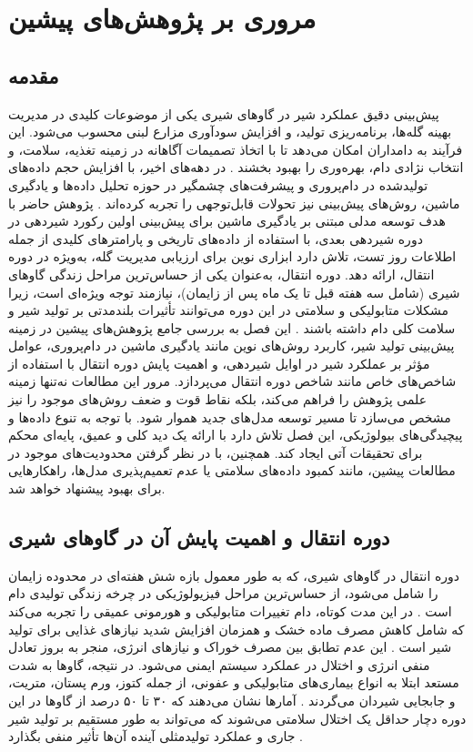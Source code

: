 \chapter{مروری بر پژوهش‌های پیشین}

\section{مقدمه}	
پیش‌بینی دقیق عملکرد شیر در گاوهای شیری یکی از موضوعات کلیدی در مدیریت بهینه گله‌ها، برنامه‌ریزی تولید، و افزایش سودآوری مزارع لبنی محسوب می‌شود. این فرآیند به دامداران امکان می‌دهد تا با اتخاذ تصمیمات آگاهانه در زمینه تغذیه، سلامت، و انتخاب نژادی دام، بهره‌وری را بهبود بخشند \cite{Dematawewa2007}. در دهه‌های اخیر، با افزایش حجم داده‌های تولیدشده در دام‌پروری و پیشرفت‌های چشمگیر در حوزه تحلیل داده‌ها و یادگیری ماشین، روش‌های پیش‌بینی نیز تحولات قابل‌توجهی را تجربه کرده‌اند \cite{Adriaens2021}. پژوهش حاضر با هدف توسعه مدلی مبتنی بر یادگیری ماشین برای پیش‌بینی اولین رکورد شیردهی در دوره شیردهی بعدی، با استفاده از داده‌های تاریخی و پارامترهای کلیدی از جمله اطلاعات روز تست، تلاش دارد ابزاری نوین برای ارزیابی مدیریت گله، به‌ویژه در دوره انتقال، ارائه دهد. دوره انتقال، به‌عنوان یکی از حساس‌ترین مراحل زندگی گاوهای شیری (شامل سه هفته قبل تا یک ماه پس از زایمان)، نیازمند توجه ویژه‌ای است، زیرا مشکلات متابولیکی و سلامتی در این دوره می‌توانند تأثیرات بلندمدتی بر تولید شیر و سلامت کلی دام داشته باشند \cite{Drackley1999, LeBlanc2010}.
این فصل به بررسی جامع پژوهش‌های پیشین در زمینه پیش‌بینی تولید شیر، کاربرد روش‌های نوین مانند یادگیری ماشین در دام‌پروری، عوامل مؤثر بر عملکرد شیر در اوایل شیردهی، و اهمیت پایش دوره انتقال با استفاده از شاخص‌های خاص مانند شاخص دوره انتقال می‌پردازد. مرور این مطالعات نه‌تنها زمینه علمی پژوهش را فراهم می‌کند، بلکه نقاط قوت و ضعف روش‌های موجود را نیز مشخص می‌سازد تا مسیر توسعه مدل‌های جدید هموار شود. با توجه به تنوع داده‌ها و پیچیدگی‌های بیولوژیکی، این فصل تلاش دارد با ارائه یک دید کلی و عمیق، پایه‌ای محکم برای تحقیقات آتی ایجاد کند. همچنین، با در نظر گرفتن محدودیت‌های موجود در مطالعات پیشین، مانند کمبود داده‌های سلامتی یا عدم تعمیم‌پذیری مدل‌ها، راهکارهایی برای بهبود پیشنهاد خواهد شد.
	
\section{دوره انتقال و اهمیت پایش آن در گاوهای شیری}
دوره انتقال در گاوهای شیری، که به طور معمول بازه شش هفته‌ای در محدوده زایمان را شامل می‌شود، از حساس‌ترین مراحل فیزیولوژیکی در چرخه زندگی تولیدی دام است \cite{Drackley1999}. در این مدت کوتاه، دام تغییرات متابولیکی و هورمونی عمیقی را تجربه می‌کند که شامل کاهش مصرف ماده خشک و همزمان افزایش شدید نیازهای غذایی برای تولید شیر است \cite{Dallago2019}. این عدم تطابق بین مصرف خوراک و نیازهای انرژی، منجر به بروز تعادل منفی انرژی و اختلال در عملکرد سیستم ایمنی می‌شود. در نتیجه، گاوها به شدت مستعد ابتلا به انواع بیماری‌های متابولیکی و عفونی، از جمله کتوز، ورم پستان، متریت، و جابجایی شیردان می‌گردند \cite{LeBlanc2010}. آمارها نشان می‌دهند که ۳۰ تا ۵۰ درصد از گاوها در این دوره دچار حداقل یک اختلال سلامتی می‌شوند که می‌تواند به طور مستقیم بر تولید شیر جاری و عملکرد تولیدمثلی آینده آن‌ها تأثیر منفی بگذارد \cite{Salamone2022}.

